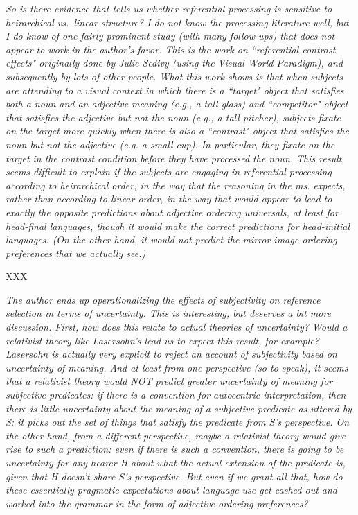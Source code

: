 \documentclass[12pt]{article}
\begin{document}
\emph{So is there evidence that tells us whether referential processing is
sensitive to heirarchical vs.~linear structure?  I do not know the
processing literature well, but I do know of one fairly prominent study
(with many follow-ups) that does not appear to work in the author's favor. 
This is the work on ``referential contrast effects" originally done by Julie
Sedivy (using the Visual World Paradigm), and subsequently by lots of other
people.  What this work shows is that when subjects are attending to a
visual context in which there is a ``target" object that satisfies both a
noun and an adjective meaning (e.g., a tall glass) and ``competitor" object
that satisfies the adjective but not the noun (e.g., a tall pitcher),
subjects fixate on the target more quickly when there is also a ``contrast"
object that satisfies the noun but not the adjective (e.g. a small cup).  In
particular, they fixate on the target in the contrast condition before they
have processed the noun.  This result seems difficult to explain if the
subjects are engaging in referential processing according to heirarchical
order, in the way that the reasoning in the ms. expects, rather than
according to linear order, in the way that would appear to lead to exactly
the opposite predictions about adjective ordering universals, at least for
head-final languages, though it would make the correct predictions for
head-initial languages.  (On the other hand, it would not predict the
mirror-image ordering preferences that we actually see.)}

XXX

\item \emph{The author ends up operationalizing the effects of subjectivity on
reference selection in terms of uncertainty.  This is interesting, but
deserves a bit more discussion.  First, how does this relate to actual
theories of uncertainty?  Would a relativist theory like Lasersohn's lead us
to expect this result, for example? Lasersohn is actually very explicit to
reject an account of subjectivity based on uncertainty of meaning. And at
least from one perspective (so to speak), it seems that a relativist theory
would NOT predict greater uncertainty of meaning for subjective predicates: 
if there is a convention for autocentric interpretation, then there is
little uncertainty about the meaning of a subjective predicate as uttered by
S:  it picks out the set of things that satisfy the predicate from S's
perspective.  On the other hand, from a different perspective, maybe a
relativist theory would give rise to such a prediction:  even if there is
such a convention, there is going to be uncertainty for any hearer H about
what the actual extension of the predicate is, given that H doesn't share
S's perspective.  But even if we grant all that, how do these essentially
pragmatic expectations about language use get cashed out and worked into the
grammar in the form of adjective ordering preferences?}
\end{document}
